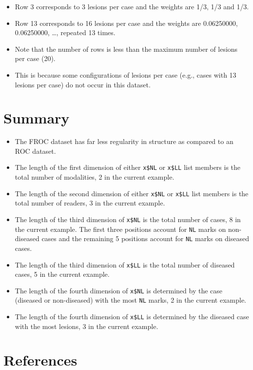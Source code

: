 \documentclass[
]{book}
\providecommand{\tightlist}{%
  \setlength{\itemsep}{0pt}\setlength{\parskip}{0pt}}
\begin{document}
\begin{itemize}
\tightlist
\item
  Row 3 corresponds to 3 lesions per case and the weights are 1/3, 1/3 and 1/3.
\item
  Row 13 corresponds to 16 lesions per case and the weights are 0.06250000, 0.06250000, \ldots, repeated 13 times.
\item
  Note that the number of rows is less than the maximum number of lesions per case (20).
\item
  This is because some configurations of lesions per case (e.g., cases with 13 lesions per case) do not occur in this dataset.
\end{itemize}

\hypertarget{summary}{%
\section{Summary}\label{summary}}

\begin{itemize}
\tightlist
\item
  The FROC dataset has far less regularity in structure as compared to an ROC dataset.
\item
  The length of the first dimension of either \texttt{x\$NL} or \texttt{x\$LL} list members is the total number of modalities, 2 in the current example.
\item
  The length of the second dimension of either \texttt{x\$NL} or \texttt{x\$LL} list members is the total number of readers, 3 in the current example.
\item
  The length of the third dimension of \texttt{x\$NL} is the total number of cases, 8 in the current example. The first three positions account for \texttt{NL} marks on non-diseased cases and the remaining 5 positions account for \texttt{NL} marks on diseased cases.
\item
  The length of the third dimension of \texttt{x\$LL} is the total number of diseased cases, 5 in the current example.
\item
  The length of the fourth dimension of \texttt{x\$NL} is determined by the case (diseased or non-diseased) with the most \texttt{NL} marks, 2 in the current example.
\item
  The length of the fourth dimension of \texttt{x\$LL} is determined by the diseased case with the most lesions, 3 in the current example.
\end{itemize}

\hypertarget{references-1}{%
\section{References}\label{references-1}}
\end{document}

